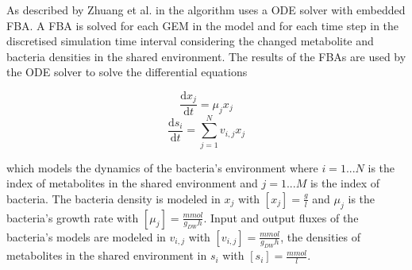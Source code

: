 \documentclass[a4paper,10pt]{article}
\begin{document}
%
% 


As described by Zhuang et al. in \cite{zhuang_genome-scale_2011} the algorithm uses a ODE solver with embedded FBA. A FBA is solved
for each GEM in the model and for each time step in the discretised simulation time interval considering the changed metabolite and
bacteria densities in the shared environment. The results of the FBAs are used by the ODE solver to solve the differential equations

\begin{equation} \label{eq:diff_eq_x}
 \frac{\mathrm d x_j}{\mathrm d t} = \mu_j x_j
\end{equation}
\begin{equation} \label{eq:diff_eq_s}
 \frac{\mathrm d s_i}{\mathrm d t} = \displaystyle\sum_{j=1}^{N} v_{i,j} x_j
\end{equation}

which models the dynamics of the bacteria's environment \cite{zhuang_design_2012} where $i = 1...N$ is the index of metabolites in the shared environment and $j = 1...M$ is the index of bacteria.
The bacteria density is modeled in $x_j$ with $\left[ x_j \right] = \frac{g}{l}$ and $\mu_j$ is the bacteria's growth rate with $\left[ \mu_j \right] = \frac{mmol}{g_{DW} h}$.
Input and output fluxes of the bacteria's models are modeled in $v_{i,j}$ with $\left[ v_{i,j} \right] = \frac{mmol}{g_{DW} h}$,
the densities of metabolites in the shared environment in $s_i$ with $\left[ s_i \right] = \frac{mmol}{l}$.
\end{document}

